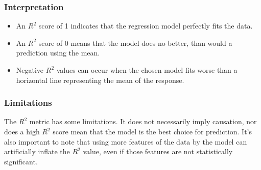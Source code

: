 \subsubsection{Interpretation}
\begin{itemize}
	\item An \(R^2\) score of 1 indicates that the regression model perfectly fits the data.
	\item An \(R^2\) score of 0 means that the model does no better, than would a prediction using the mean.
	\item Negative \(R^2\) values can occur when the chosen model fits worse than a horizontal line representing the mean of the response.
\end{itemize}

\subsubsection{Limitations}
The \(R^2\) metric has some limitations. It does not necessarily imply causation, nor does a high \(R^2\) score mean that the model is the best choice for prediction. It's also important to note that using more features of the data by the model can artificially inflate the \(R^2\) value, even if those features are not statistically significant.


